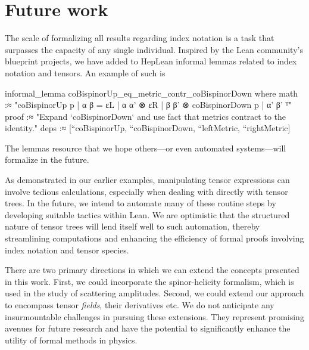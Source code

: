 \documentclass[a4paper, 11pt]{article}
\begin{document}
\section{Future work}
The scale of formalizing all results regarding index notation is a task that surpasses 
the capacity of any single individual. Inspired by the Lean community's 
blueprint projects, we have added to HepLean informal lemmas related to index notation and tensors. 
An example of such is 
\begin{code} 
informal_lemma coBispinorUp_eq_metric_contr_coBispinorDown where
  math :≈ "{coBispinorUp p | α β = εL | α α' ⊗ εR | β β' ⊗ coBispinorDown p | α' β' }ᵀ"
  proof :≈ "Expand `coBispinorDown` and use fact that metrics contract to the identity."
  deps :≈ [``coBispinorUp, ``coBispinorDown, ``leftMetric, ``rightMetric]
\end{code}
The lemmas  resource that we hope others—or even automated systems—will formalize in the future.

As demonstrated in our earlier examples, manipulating tensor expressions can involve tedious
 calculations, especially when dealing with directly with tensor trees. 
In the future, we intend to automate many of these routine steps by developing suitable tactics 
within Lean. We are optimistic that the structured nature of tensor trees will lend itself well to 
such automation, thereby streamlining computations and enhancing the efficiency of formal proofs
involving index notation and tensor species.

There are two primary directions in which we can extend the concepts presented in this work. 
First, we could incorporate the spinor-helicity formalism, which is used in the study of scattering 
amplitudes. Second, we could extend our approach to encompass tensor \emph{fields}, their derivatives
etc. We do not anticipate any insurmountable challenges in pursuing these extensions. 
They represent promising avenues for future research and have the potential to significantly enhance
the utility of formal methods in physics.

\begin{spacing}{0.5}

\end{spacing}


\end{document}
